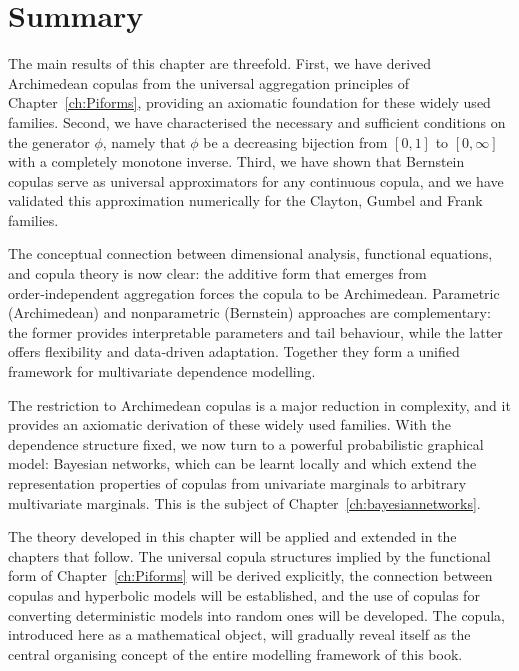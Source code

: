 \section{Summary}

The main results of this chapter are threefold. First, we have derived Archimedean copulas from the universal aggregation principles of Chapter~\ref{ch:Piforms}, providing an axiomatic foundation for these widely used families. Second, we have characterised the necessary and sufficient conditions on the generator \(\phi\), namely that \(\phi\) be a decreasing bijection from \([0,1]\) to \([0,\infty]\) with a completely monotone inverse. Third, we have shown that Bernstein copulas serve as universal approximators for any continuous copula, and we have validated this approximation numerically for the Clayton, Gumbel and Frank families.

The conceptual connection between dimensional analysis, functional equations, and copula theory is now clear: the additive form that emerges from order‑independent aggregation forces the copula to be Archimedean. Parametric (Archimedean) and nonparametric (Bernstein) approaches are complementary: the former provides interpretable parameters and tail behaviour, while the latter offers flexibility and data‑driven adaptation. Together they form a unified framework for multivariate dependence modelling.

The restriction to Archimedean copulas is a major reduction in complexity, and it provides an axiomatic derivation of these widely used families. With the dependence structure fixed, we now turn to a powerful probabilistic graphical model: Bayesian networks, which can be learnt locally and which extend the representation properties of copulas from univariate marginals to arbitrary multivariate marginals. This is the subject of Chapter~\ref{ch:bayesiannetworks}.

The theory developed in this chapter will be applied and extended in the chapters that follow. The universal copula structures implied by the functional form of Chapter~\ref{ch:Piforms} will be derived explicitly, the connection between copulas and hyperbolic models will be established, and the use of copulas for converting deterministic models into random ones will be developed. The copula, introduced here as a mathematical object, will gradually reveal itself as the central organising concept of the entire modelling framework of this book.
